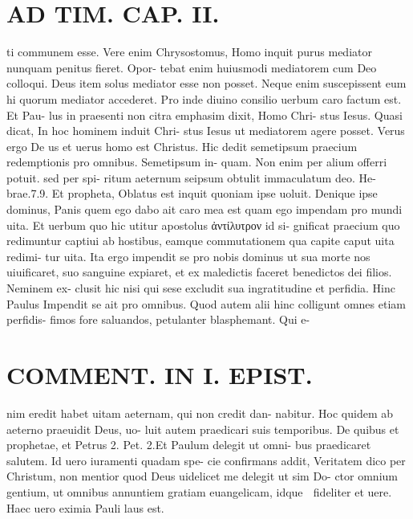 \documentclass{article}
\begin{document}
\begin{pages}
\section*{AD TIM. CAP. II. }
\marginpar{[ p.118 ]}\pstart ti communem esse. Vere enim Chrysostomus, Homo inquit purus mediator nunquam penitus fieret. Opor- tebat enim huiusmodi mediatorem cum Deo colloqui. Deus item solus mediator esse non posset. Neque enim suscepissent eum hi quorum mediator accederet. Pro inde diuino consilio uerbum caro factum est. Et Pau- lus in praesenti non citra emphasim dixit, Homo Chri- stus Iesus. Quasi dicat, In hoc hominem induit Chri- stus Iesus ut mediatorem agere posset. Verus ergo De us et uerus homo est Christus. Hic dedit semetipsum praecium redemptionis pro omnibus. Semetipsum in- quam. Non enim per alium offerri potuit. sed per spi- ritum aeternum seipsum obtulit immaculatum deo. He- brae.7.9. Et propheta, Oblatus est inquit quoniam ipse uoluit. Denique ipse dominus, Panis quem ego dabo ait caro mea est quam ego impendam pro mundi uita. Et uerbum quo hic utitur apostolus ἀντίλυτρον id si- gnificat praecium quo redimuntur captiui ab hostibus, eamque commutationem qua capite caput uita redimi- tur uita. Ita ergo impendit se pro nobis dominus ut sua morte nos uiuificaret, suo sanguine expiaret, et ex maledictis faceret benedictos dei filios. Neminem ex- clusit hic nisi qui sese excludit sua ingratitudine et perfidia. Hinc Paulus Impendit se ait pro omnibus. Quod autem alii hinc colligunt omnes etiam perfidis- fimos fore saluandos, petulanter blasphemant. Qui e-  \pend
\section*{COMMENT. IN I. EPIST. }\pstart nim eredit habet uitam aeternam, qui non credit dan- nabitur. Hoc quidem ab aeterno praeuidit Deus, uo- luit autem praedicari suis temporibus. De quibus et prophetae, et Petrus 2. Pet. 2.Et Paulum delegit ut omni- bus praedicaret salutem. Id uero iuramenti quadam spe- cie confirmans addit, Veritatem dico per Christum, non mentior quod Deus uidelicet me delegit ut sim Do- ctor omnium gentium, ut omnibus annuntiem gratiam euangelicam, idque  fideliter et uere. Haec uero eximia Pauli laus est.  \pend
{}
{}

\end{pages}
\end{document}
